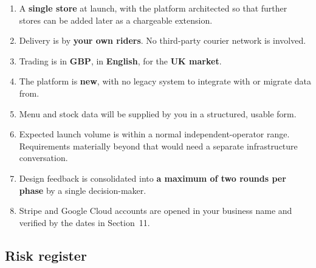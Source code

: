 \documentclass[11pt,a4paper]{article}
\begin{document}
\begin{enumerate}[leftmargin=17pt]
\item A \textbf{single store} at launch, with the platform architected so that further
stores can be added later as a chargeable extension.
\item Delivery is by \textbf{your own riders}. No third-party courier network is involved.
\item Trading is in \textbf{GBP}, in \textbf{English}, for the \textbf{UK market}.
\item The platform is \textbf{new}, with no legacy system to integrate with or migrate
data from.
\item Menu and stock data will be supplied by you in a structured, usable form.
\item Expected launch volume is within a normal independent-operator range. Requirements
materially beyond that would need a separate infrastructure conversation.
\item Design feedback is consolidated into \textbf{a maximum of two rounds per phase} by
a single decision-maker.
\item Stripe and Google Cloud accounts are opened in your business name and verified by
the dates in Section~11.
\end{enumerate}

\subsection{Risk register}
\end{document}
